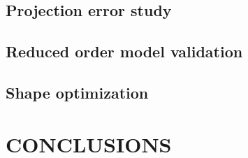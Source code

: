\documentclass[a4paper]{eccomas_paper-2024}
\begin{document}
\subsection{Projection error study} %
\label{sub:Projection error study}


\subsection{Reduced order model validation} %
\label{sub:Reduced order model validation}


\subsection{Shape optimization} %
\label{sub:Shape optimization}


\section{CONCLUSIONS} %
\label{sec:conclusions}




\end{document}
